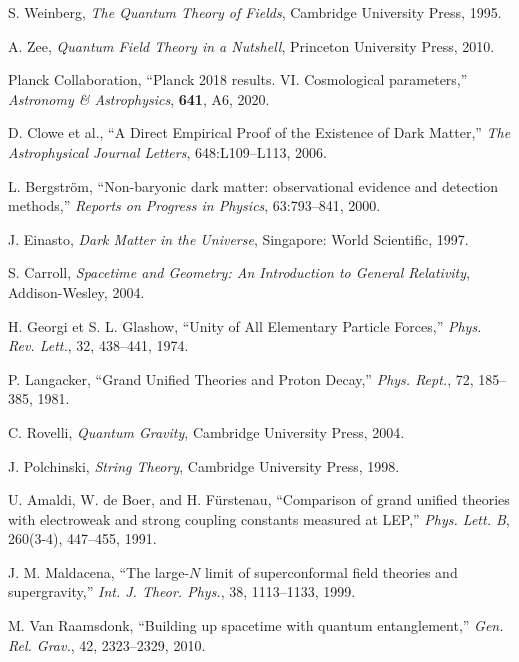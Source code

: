\documentclass[12pt]{article}
\begin{document}
\begin{thebibliography}{9}

S. Weinberg, 
\textit{The Quantum Theory of Fields}, 
Cambridge University Press, 1995.

A. Zee, 
\textit{Quantum Field Theory in a Nutshell}, 
Princeton University Press, 2010.

Planck Collaboration, 
``Planck 2018 results. VI. Cosmological parameters,'' 
\textit{Astronomy \& Astrophysics}, \textbf{641}, A6, 2020.

D. Clowe et al.,
``A Direct Empirical Proof of the Existence of Dark Matter,''
\textit{The Astrophysical Journal Letters}, 648:L109--L113, 2006.

L. Bergström,
``Non-baryonic dark matter: observational evidence and detection methods,''
\textit{Reports on Progress in Physics}, 63:793--841, 2000.

J. Einasto,
\textit{Dark Matter in the Universe}, 
Singapore: World Scientific, 1997.

S. Carroll,
\textit{Spacetime and Geometry: An Introduction to General Relativity},
Addison-Wesley, 2004.

H. Georgi et S. L. Glashow, 
``Unity of All Elementary Particle Forces,'' 
\textit{Phys. Rev. Lett.}, 32, 438--441, 1974.

P. Langacker, 
``Grand Unified Theories and Proton Decay,'' 
\textit{Phys. Rept.}, 72, 185--385, 1981.

C. Rovelli, 
\textit{Quantum Gravity}, 
Cambridge University Press, 2004.

J. Polchinski, 
\textit{String Theory}, 
Cambridge University Press, 1998.

U. Amaldi, W. de Boer, and H. Fürstenau, 
``Comparison of grand unified theories with electroweak and strong coupling constants measured at LEP,'' 
\textit{Phys. Lett. B}, 260(3-4), 447--455, 1991.

J. M. Maldacena, 
``The large-$N$ limit of superconformal field theories and supergravity,'' 
\textit{Int. J. Theor. Phys.}, 38, 1113--1133, 1999.

M. Van Raamsdonk, 
``Building up spacetime with quantum entanglement,'' 
\textit{Gen. Rel. Grav.}, 42, 2323--2329, 2010.


\end{thebibliography}
\end{document}
